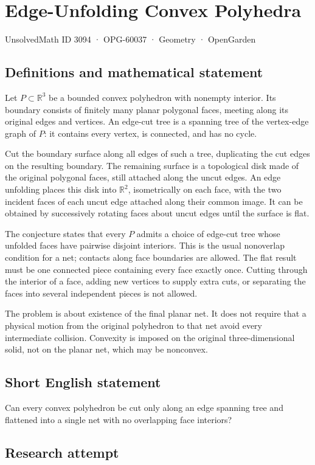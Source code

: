 \documentclass[11pt,a4paper]{article}
\begin{document}
\section*{Edge-Unfolding Convex Polyhedra}\label{3094}
{\small UnsolvedMath ID 3094 · OPG-60037 · Geometry · OpenGarden}
\subsection{Definitions and mathematical statement}
Let $P\subset\mathbb R^3$ be a bounded convex polyhedron with nonempty
interior. Its boundary consists of finitely many planar polygonal faces,
meeting along its original edges and vertices. An edge-cut tree is a
spanning tree of the vertex-edge graph of $P$: it contains every vertex,
is connected, and has no cycle.

Cut the boundary surface along all edges of such a tree, duplicating the
cut edges on the resulting boundary. The remaining surface is a topological
disk made of the original polygonal faces, still attached along the uncut
edges. An edge unfolding places this disk into $\mathbb R^2$, isometrically
on each face, with the two incident faces of each uncut edge attached
along their common image. It can be obtained by successively rotating
faces about uncut edges until the surface is flat.

The conjecture states that every $P$ admits a choice of edge-cut tree
whose unfolded faces have pairwise disjoint interiors. This is the usual
nonoverlap condition for a net; contacts along face boundaries are allowed.
The flat result must be one connected piece containing every face exactly
once. Cutting through the interior of a face, adding new vertices to
supply extra cuts, or separating the faces into several independent pieces
is not allowed.

The problem is about existence of the final planar net. It does not
require that a physical motion from the original polyhedron to that net
avoid every intermediate collision. Convexity is imposed on the original
three-dimensional solid, not on the planar net, which may be nonconvex.
\subsection{Short English statement}
Can every convex polyhedron be cut only along an edge spanning tree and flattened into a single net with no overlapping face interiors?
\subsection{Research attempt}
\end{document}
